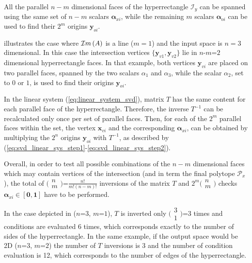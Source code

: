 All the parallel $n\!-\!m$ dimensional faces of the hyperrectangle $\mathcal{I}_y$ can be spanned using the same set of $n\!-\!m$ scalars $\bm{\alpha}_{xi}$, while the remaining $m$ scalars $\bm{\alpha}_{oi}$ can be used to find their $2^m$ origins $\bm{y}_{oi}$.

 illustrates the case where $\mathcal{I}m\left(A\right)$ is a line ($m=1$) and the input space is $n=3$ dimensional. In this case the intersection vertices $\{\bm{y}_{v1},\bm{y}_{v2}\}$ lie in $n$-$m$=$2$ dimensional hyperrectangle faces. In that example, both vertices $\bm{y}_{vi}$ are placed on two parallel faces, spanned by the two scalars $\alpha_1$ and $\alpha_3$, while the scalar $\alpha_2$, set to $0$ or $1$, is used to find their origins $\bm{y}_{oi}$.

In the linear system (\ref{eq:linear_system_svd}), matrix $T$ has the same content for each parallel face of the hyperrectangle. Therefore, the inverse $T^{-1}$ can be recalculated only once per set of parallel faces. Then, for each of the $2^m$ parallel faces within the set, the vertex $\bm{x}_{vi}$ and the corresponding $\bm{\alpha}_{xi}$, can be obtained by multiplying the $2^n$ origins $\bm{y}_{oi}$ with $T^{-1}$, as described by (\ref{eq:svd_linear_sys_step1}-\ref{eq:svd_linear_sys_step2}).

Overall, in order to test all possible combinations of the $n\!-\!m$ dimensional faces which may contain vertices of the intersection (and in term the final polytope $\mathcal{P}_x$), the total of $\big(\begin{smallmatrix}n\\m\end{smallmatrix}\big)$=$\frac{n!}{m!(n-m)!}$ inversions of the matrix $T$ and  $2^m\big(\begin{smallmatrix}n\\m\end{smallmatrix}\big)$ checks $\bm{\alpha}_{xi} \in [\bm{0},\bm{1}]$ have to be performed.

In the case depicted in  ($n$=$3$, $m$=$1$), $T$ is inverted only $\big(\begin{smallmatrix}3\\1\end{smallmatrix}\big)$=$3$ times and conditions are evaluated 6 times, which corresponds exactly to the number of sides of the hyperrectangle. In the same example, if the output space would be 2D ($n$=$3$, $m$=$2$) the number of $T$ inversions is 3 and the number of condition evaluation is 12, which corresponds to the number of edges of the hyperrectangle. 

